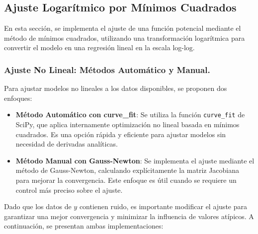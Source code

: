 \documentclass{article}
\begin{document}


\subsection{Ajuste Logarítmico por Mínimos Cuadrados}
En esta sección, se implementa el ajuste de una función potencial mediante el método de mínimos cuadrados, utilizando una transformación logarítmica para convertir el modelo en una regresión lineal en la escala log-log.



\newpage
\subsubsection{Ajuste No Lineal: Métodos Automático y Manual.}

Para ajustar modelos no lineales a los datos disponibles, se proponen dos enfoques:

\begin{itemize}
    \item \textbf{Método Automático con curve\_fit}: Se utiliza la función \texttt{curve\_fit} de SciPy, que aplica internamente optimización no lineal basada en mínimos cuadrados. Es una opción rápida y eficiente para ajustar modelos sin necesidad de derivadas analíticas.
    \item \textbf{Método Manual con Gauss-Newton}: Se implementa el ajuste mediante el método de Gauss-Newton, calculando explícitamente la matriz Jacobiana para mejorar la convergencia. Este enfoque es útil cuando se requiere un control más preciso sobre el ajuste.
\end{itemize}

Dado que los datos de \( y \) contienen ruido, es importante modificar el ajuste para garantizar una mejor convergencia y minimizar la influencia de valores atípicos. A continuación, se presentan ambas implementaciones:



\newpage

\end{document}

